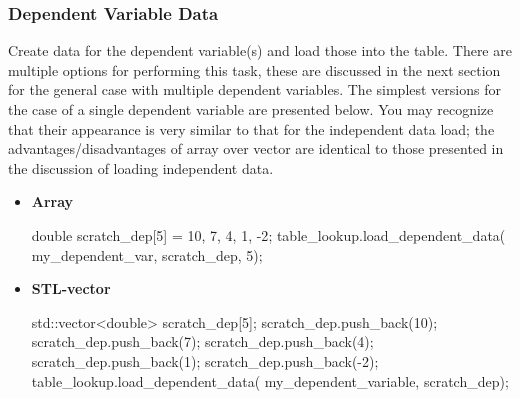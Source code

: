 \documentclass[11pt,fleqn]{report}
\begin{document}
\subsubsection{Dependent Variable Data}
\label{sec:UG_dependent_variable_data}
Create data for the dependent variable(s) and load those into the table.
  There are multiple options for performing this task, these are
 discussed in the next section for the general case with multiple
 dependent variables.  The simplest versions for the case of a single
 dependent variable are presented below.  You may recognize that their
 appearance is very similar to that for the independent data load;
 the advantages/disadvantages of array over vector are identical to those
 presented in the discussion of loading independent data.
\begin{itemize}
 \item \textbf{Array}
\begin{code}
 double scratch_dep[5] = {10, 7, 4, 1, -2};
 table_lookup.load_dependent_data( my_dependent_var,
                                   scratch_dep,
                                   5);
\end{code}

\item \textbf{STL-vector}
\begin{code}
std::vector<double> scratch_dep[5];
scratch_dep.push_back(10);
scratch_dep.push_back(7);
scratch_dep.push_back(4);
scratch_dep.push_back(1);
scratch_dep.push_back(-2);
table_lookup.load_dependent_data( my_dependent_variable,
                                  scratch_dep);
\end{code}


\end{itemize}
\end{document}

